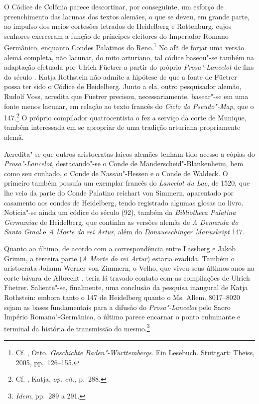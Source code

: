 O Códice de Colônia parece descortinar, por conseguinte, um esforço de
preenchimento das lacunas dos textos alemães, o que se deveu, em grande parte,
ao impulso dos meios cortesões letrados de Heidelberg e Rottenburg, cujos
senhores exerceram a função de príncipes eleitores do Imperador Romano
Germânico, enquanto Condes Palatinos do Reno.\footnote{ Cf. , Otto.
\textit{Geschichte Baden"-Württembergs}.  Ein Lesebuch. Stuttgart: Theiss, 2005,
pp.~126--155. } No afã de forjar uma versão alemã completa, não lacunar, do
mito arturiano, tal códice baseou"-se também na adaptação efetuada por Ulrich
Füetrer a partir do próprio \textit{Prosa"-Lancelot} de fins do século
. Katja Rothstein não admite a hipótese de que a fonte de Füetrer
possa ter sido o Códice de Heidelberg. Junto a ela, outro pesquisador alemão,
Rudolf Voss, acredita que Füetrer precisou, necessariamente, basear"-se em uma
fonte menos lacunar, em relação ao texto francês do \textit{Ciclo do
Pseudo"-Map}, que o 147.\footnote{ Cf. , Katja, \textit{op. cit.},
p.~288. } O próprio compilador quatrocentista o fez a serviço da corte de
Munique, também interessada em se apropriar de uma tradição arturiana
propriamente alemã.

Acredita"-se que outros aristocratas laicos alemães tenham tido acesso a cópias
do \textit{Prosa"-Lancelot}, destacando"-se o Conde de Manderscheid"-Blankenheim,
bem como seu cunhado, o Conde de Nassau"-Hessen e o Conde de Waldeck. O primeiro
também possuía um exemplar francês do \textit{Lancelot du Lac}, de 1520, que lhe
veio da parte do Conde Palatino reichart von Simmern, aparentado por casamento
aos condes de Heidelberg, tendo registrado algumas glosas no livro. Noticia"-se
ainda um códice do século  (92), também da \textit{Bibliotheca
Palatina Germaniae} de Heidelberg, que continha as versões alemãs de \textit{A
Demanda do Santo Graal} e \textit{A Morte do rei Artur}, além do
\textit{Donaueschinger Manuskript} 147.
	
Quanto ao último, de acordo com a correspondência entre Lassberg e Jakob Grimm,
a terceira parte (\textit{A Morte do rei Artur}) estaria evadida. Também o
aristocrata Johann Werner von Zimmern, o Velho, que viveu seus últimos anos na
corte bávara de Albrecht , teria lá travado contato com as
compilações de Ulrich Füetrer. Saliente"-se, finalmente, uma conclusão da
pesquisa inaugural de Katja Rothstein: embora tanto o 147 de Heidelberg
quanto o Ms. Allem. 8017--8020 sejam as bases fundamentais para a difusão do
\textit{Prosa"-Lancelot} pelo Sacro Império Romano"-Germânico, o último parece
encarnar o ponto culminante e terminal da história de transmissão do
mesmo.\footnote{ \textit{Idem}, pp.~289 a 291. }


